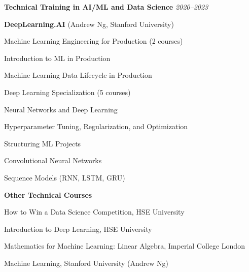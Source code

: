 {\bf Technical Training in AI/ML and Data Science} \hfill {\it 2020--2023}
\begin{list1}

\vspace*{.05in}
\item[] {\bf DeepLearning.AI} (Andrew Ng, Stanford University)
\vspace*{.05in}
\item[] Machine Learning Engineering for Production (2 courses)
\begin{list2}
\vspace*{.05in}
\item Introduction to ML in Production
\item Machine Learning Data Lifecycle in Production
\end{list2}

\vspace*{.05in}
\item[]  Deep Learning Specialization (5 courses)
\begin{list2}
\vspace*{.05in}
\item Neural Networks and Deep Learning
\item Hyperparameter Tuning, Regularization, and Optimization
\item Structuring ML Projects
\item Convolutional Neural Networks
\item Sequence Models (RNN, LSTM, GRU)
\end{list2}
\vspace*{.05in}

\item[] {\bf Other Technical Courses}
\begin{list2}
\vspace*{.05in}
\item How to Win a Data Science Competition, HSE University
\item Introduction to Deep Learning, HSE University
\item Mathematics for Machine Learning: Linear Algebra, Imperial College London
\item Machine Learning, Stanford University (Andrew Ng)
\end{list2}
\end{list1}

